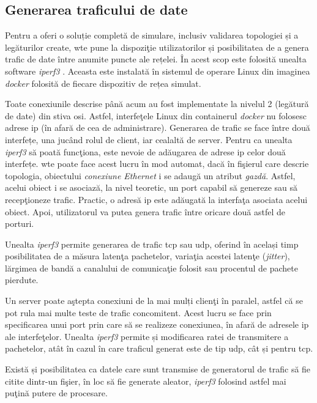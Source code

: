 \subsection{Generarea traficului de date}

Pentru a oferi o soluție completă de simulare, inclusiv validarea topologiei și a legăturilor create, \gls{wte} pune la dispoziţie utilizatorilor și posibilitatea de a genera trafic de date între anumite puncte ale rețelei. În acest scop este folosită unealta software \textit{iperf3} \cite{iperf32017, tirumala2005iperf}. Aceasta este instalată în sistemul de operare Linux din imaginea \textit{docker} folosită de fiecare dispozitiv de rețea simulat.

Toate conexiunile descrise până acum au fost implementate la nivelul 2 (legătură de date) din stiva \gls{osi}. Astfel, interfeţele Linux din containerul \textit{docker} nu folosesc adrese \gls{ip} (în afară de cea de administrare). Generarea de trafic se face între două interfețe, una jucând rolul de client, iar cealaltă de server. Pentru ca unealta \textit{iperf3} să poată funcţiona, este nevoie de adăugarea de adrese \gls{ip} celor două interfețe. \gls{wte} poate face acest lucru în mod automat, dacă în fişierul care descrie topologia, obiectului \textit{conexiune Ethernet} i se adaugă un atribut \textit{gazdă}. Astfel, acelui obiect i se asociază, la nivel teoretic, un port capabil să genereze sau să recepţioneze trafic. Practic, o adresă \gls{ip} este adăugată la interfaţa asociata acelui obiect. Apoi, utilizatorul va putea genera trafic între oricare două astfel de porturi. 

Unealta \textit{iperf3} permite generarea de trafic \gls{tcp} sau \gls{udp}, oferind în același timp posibilitatea de a măsura latenţa pachetelor, variaţia acestei latenţe (\textit{jitter}), lărgimea de bandă a canalului de comunicaţie folosit sau procentul de pachete pierdute.

Un server poate aştepta conexiuni de la mai mulți clienţi în paralel, astfel că se pot rula mai multe teste de trafic concomitent. Acest lucru se face prin specificarea unui port prin care să se realizeze conexiunea, în afară de adresele \gls{ip} ale interfeţelor. Unealta \textit{iperf3} permite și modificarea ratei de transmitere a pachetelor, atât în cazul în care traficul generat este de tip \gls{udp}, cât și pentru \gls{tcp}.

Există și posibilitatea ca datele care sunt transmise de generatorul de trafic să fie citite dintr-un fişier, în loc să fie generate aleator, \textit{iperf3} folosind astfel mai puţină putere de procesare.

